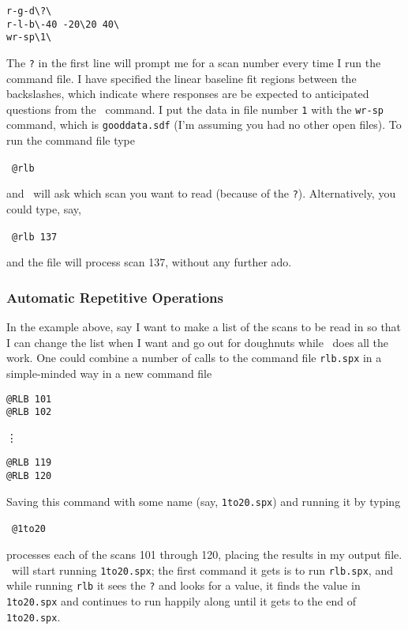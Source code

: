 \begin{verbatim}
r-g-d\?\ 
r-l-b\-40 -20\20 40\ 
wr-sp\1\ 
\end{verbatim}

The {\tt ?} in the first line will prompt me for a scan number every
time I run the command file. I have specified the linear baseline fit
regions between the backslashes, which indicate where responses are be
expected to
anticipated questions from the
\SPECX\ command. I put the data in file number {\tt 1} with the {\tt wr-sp}
command, which is {\tt gooddata.sdf} (I'm assuming you had no other open
files). To run the command file type

\SP\ \verb|@rlb|

and \SPECX\ will ask which scan you want to read (because of the {\tt ?}). 
Alternatively, you could type, say,

\SP\ \verb|@rlb 137|

and the file will process scan 137, without any further ado.

\subsubsection{Automatic Repetitive Operations}
\label{sec:specx_9.3}
In the example above, say I want to make a list of the scans to be
read in so that I can change the list when I want and go out for
doughnuts while \SPECX\ does all the work.  One could combine a number
of calls to the command file {\tt rlb.spx} in a simple-minded way in a
new command file \eg\

\begin{verbatim}
@RLB 101
@RLB 102
\end{verbatim}
\vspace*{-0.1in}
\vdots
\vspace*{-0.1in}
\begin{verbatim}
@RLB 119
@RLB 120
\end{verbatim}

Saving this command with some name (say, {\tt 1to20.spx}) and running it 
by typing 

\SP\ {\tt @1to20}

processes each of the scans 101 through 120, placing the results in my
output file. \SPECX\ will start running {\tt 1to20.spx}; the first command
it gets is to run {\tt rlb.spx}, and while running {\tt rlb} it sees
the {\tt ?} and looks for a value, it finds the value in {\tt
1to20.spx} and continues to run happily along until it gets to the end
of {\tt 1to20.spx}.

